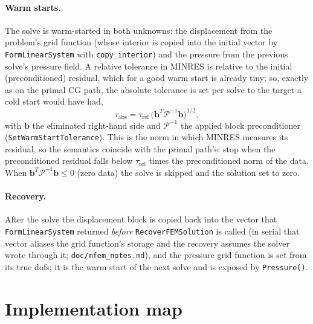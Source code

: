 \documentclass[11pt]{article}
\numberwithin{equation}{section}
\theoremstyle{remark}
\newcommand{\code}[1]{\texttt{#1}}
\begin{document}
\paragraph{Warm starts.} The solve is warm-started in both unknowns: the
displacement from the problem's grid function (whose interior is copied
into the initial vector by \code{FormLinearSystem} with
\code{copy\_interior}) and the pressure from the previous solve's pressure
field. A relative tolerance in MINRES is relative to the initial
(preconditioned) residual, which for a good warm start is already tiny;
so, exactly as on the primal CG path, the absolute tolerance is set per
solve to the target a cold start would have had,
\begin{equation}
  \tau_{\mathrm{abs}} = \tau_{\mathrm{rel}}\,
  \bigl(\mathbf b^T\mathcal P^{-1}\mathbf b\bigr)^{1/2},
\end{equation}
with $\mathbf b$ the eliminated right-hand side and $\mathcal P^{-1}$ the
applied block preconditioner (\code{SetWarmStartTolerance}). This is the
norm in which MINRES measures its residual, so the semantics coincide
with the primal path's: stop when the preconditioned residual falls below
$\tau_{\mathrm{rel}}$ times the preconditioned norm of the data. When
$\mathbf b^T\mathcal P^{-1}\mathbf b\le0$ (zero data) the solve is
skipped and the solution set to zero.

\paragraph{Recovery.} After the solve the displacement block is copied
back into the vector that \code{FormLinearSystem} returned \emph{before}
\code{RecoverFEMSolution} is called (in serial that vector aliases the
grid function's storage and the recovery assumes the solver wrote through
it; \code{doc/mfem\_notes.md}), and the pressure grid function is set from
its true dofs; it is the warm start of the next solve and is exposed by
\code{Pressure()}.

\section{Implementation map}
\label{sec:impl}
\end{document}
